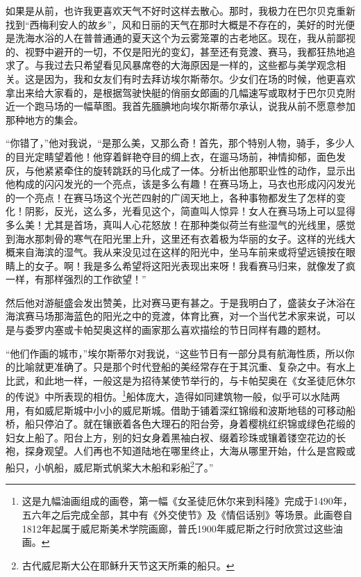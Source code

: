 \par 如果是从前，也许我更喜欢天气不好时这样去散心。那时，我极力在巴尔贝克重新找到“西梅利安人的故乡”，风和日丽的天气在那时大概是不存在的，美好的时光便是洗海水浴的人在普普通通的夏天这个为云雾笼罩的古老地区。现在，我从前鄙视的、视野中避开的一切，不仅是阳光的变幻，甚至还有竞渡、赛马，我都狂热地追求了。与我过去只希望看见风暴席卷的大海原因是一样的，这些都与美学观念相关。这是因为，我和女友们有时去拜访埃尔斯蒂尔。少女们在场的时候，他更喜欢拿出来给大家看的，是根据驾驶快艇的俏丽女郎画的几幅速写或取材于巴尔贝克附近一个跑马场的一幅草图。我首先腼腆地向埃尔斯蒂尔承认，说我从前不愿意参加那种地方的集会。
\par “你错了，”他对我说，“是那么美，又那么奇！首先，那个特别人物，骑手，多少人的目光定睛望着他！他穿着鲜艳夺目的绸上衣，在遛马场前，神情抑郁，面色发灰，与他紧紧牵住的旋转跳跃的马化成了一体。分析出他那职业性的动作，显示出他构成的闪闪发光的一个亮点，该是多么有趣！在赛马场上，马衣也形成闪闪发光的一个亮点！在赛马场这个光芒四射的广阔天地上，各种事物都发生了怎样的变化！阴影，反光，这么多，光看见这个，简直叫人惊异！女人在赛马场上可以显得多么美！尤其是首场，真叫人心花怒放！在那种类似荷兰有些湿气的光线里，感觉到海水那刺骨的寒气在阳光里上升，这里还有衣着极为华丽的女子。这样的光线大概来自海滨的湿气。我从来没见过在这样的阳光中，坐马车前来或将望远镜按在眼睛上的女子。啊！我是多么希望将这阳光表现出来呀！我看赛马归来，就像发了疯一样，有那样强烈的工作欲望！”
\par 然后他对游艇盛会发出赞美，比对赛马更有甚之。于是我明白了，盛装女子沐浴在海滨赛马场那海蓝色的阳光之中的竞渡，体育比赛，对一个当代艺术家来说，可以是与委罗内塞或卡帕契奥这样的画家那么喜欢描绘的节日同样有趣的题材。
\par “他们作画的城市，”埃尔斯蒂尔对我说，“这些节日有一部分具有航海性质，所以你的比喻就更准确了。只是那个时代登船的美经常存在于其沉重、复杂之中。有水上比武，和此地一样，一般这是为招待某使节举行的，与卡帕契奥在《女圣徒厄休尔的传说》中所表现的相仿。\footnote{这是九幅油画组成的画卷，第一幅《女圣徒厄休尔来到科隆》完成于1490年，五六年之后完成全部，其中有《外交使节》及《情侣话别》等场景。此画卷自1812年起属于威尼斯美术学院画廊，普氏1900年威尼斯之行时欣赏过这些油画。}船体庞大，造得如同建筑物一般，似乎可以水陆两用，有如威尼斯城中小小的威尼斯城。借助于铺着深红锦缎和波斯地毯的可移动船桥，船只停泊了。就在镶嵌着各色大理石的阳台旁，身着樱桃红织锦或绿色花缎的妇女上船了。阳台上方，别的妇女身着黑袖白衩、缀着珍珠或镶着镂空花边的长袍，探身观望。人们再也不知道陆地在哪里终止，大海从哪里开始，什么是宫殿或船只，小帆船，威尼斯式帆桨大木船和彩船\footnote{古代威尼斯大公在耶稣升天节这天所乘的船只。}了。”
